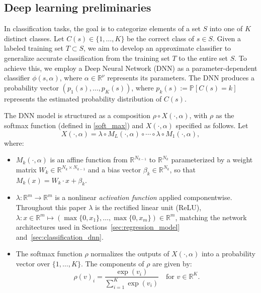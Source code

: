 \documentclass[11pt]{article}
\theoremstyle{plain}
\theoremstyle{definition}
\theoremstyle{remark}
\begin{document}
\subsection{Deep learning preliminaries}
\label{introduction_deep_neural_networks}

In classification tasks, the goal is to categorize elements of a set $S$ into one of $K$ distinct classes. Let $C(s)\in\{1,\dots,K\}$ be the correct class of $s\in S$. Given a labeled training set $T\subset S$, we aim to develop an approximate classifier to generalize accurate classification from the training set $T$ to the entire set $S$. To achieve this, we employ a Deep Neural Network (DNN) as a parameter-dependent classifier $\phi(s, \alpha)$, where $\alpha \in \mathbb{R}^\nu$ represents its parameters. The DNN produces a probability vector $(p_1(s), \dots, p_K(s))$, where $p_k(s):=\mathbb{P}[C(s)=k]$ represents the estimated probability distribution of $C(s)$.

The DNN model is structured as a composition $\rho \circ X(\cdot,\alpha)$, with $\rho$ as the softmax function (defined in \eqref{soft_max}) and $X(\cdot,\alpha)$ specified as follows. Let 
\begin{equation}
X(\cdot,\alpha)=\lambda\circ M_L(\cdot,\alpha)\circ\cdots\circ\lambda\circ M_1(\cdot,\alpha),
\end{equation}
where:
\begin{itemize}
    \item $M_k(\cdot,\alpha)$ is an affine function from $\mathbb{R}^{N_{k-1}}$ to $\mathbb{R}^{N_k}$ parameterized by a weight matrix $W_k \in \mathbb{R}^{N_k \times N_{k-1}}$ and a bias vector $\beta_k \in \mathbb{R}^{N_k}$, so that $M_k(x) = W_k \cdot x + \beta_k$.
    \item $\lambda: \mathbb{R}^m \rightarrow \mathbb{R}^m$ is a nonlinear \emph{activation function} applied componentwise. Throughout this paper $\lambda$ is the rectified linear unit (ReLU), $\lambda: x \in \mathbb{R}^m \mapsto (\max\{0,x_1\}, \dots, \max\{0,x_m\}) \in \mathbb{R}^m$, matching the network architectures used in Sections~\ref{sec:regression_model} and~\ref{sec:classification_dnn}.
    \item The softmax function $\rho$ normalizes the outputs of $X(\cdot,\alpha)$ into a probability vector over $\{1, \dots, K\}$. The components of $\rho$ are given by:
    \begin{equation}
    \label{soft_max}
    \rho(v)_i = \frac{\exp(v_i)}{\sum_{i=1}^{K} \exp(v_i)} \quad \text{for } v \in \mathbb{R}^K.
    \end{equation}
\end{itemize}
\end{document}
